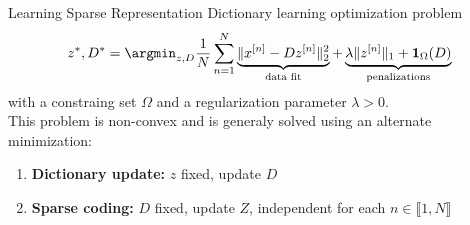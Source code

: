 \documentclass[defense.tex]{subfiles}
\begin{document}

\begin{frame}{Learning Sparse Representation}
Dictionary learning optimization problem
\[
	z^*, D^* = \argmin_{z, D}\frac{1}{N}\sum_{n=1}^N
			\underbrace{\| x^{[n]} - D z^{[n]}\|_2^2
						}_{\text{data fit}} +
			\underbrace{\lambda\| z^{[n]}\|_1 + \textbf{1}_{\Omega}(D)
						}_{\text{penalizations}}
\]
with a constraing set $\Omega$ and a regularization parameter $\lambda > 0$.\\[1em] 
This problem is non-convex and is generaly solved using an alternate minimization:

\begin{enumerate}\itemsep.5em
	\item \textbf{Dictionary update:} $z$ fixed, update $ D$ 
	\item \textbf{Sparse coding:} $ D$ fixed, update $Z$, independent for each $n\in\llbracket1, N\rrbracket$ 
\end{enumerate}

	
\end{frame}
\end{document}
